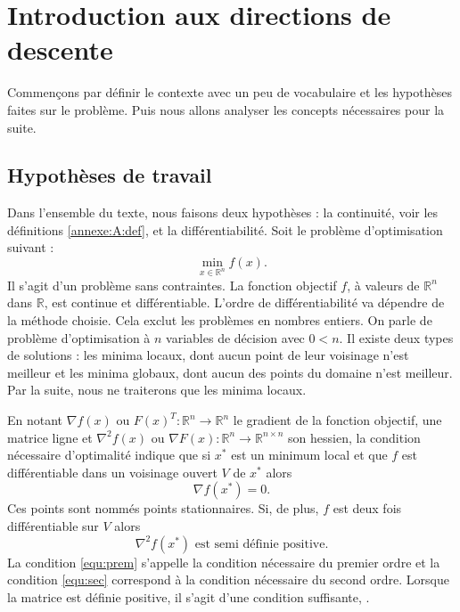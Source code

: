 







\section{Introduction aux directions de descente}
Commençons par d\'efinir le contexte avec un peu de vocabulaire et les hypoth\`eses faites sur le probl\`eme. Puis nous allons analyser
 les concepts n\'ecessaires pour la suite. 
\subsection{Hypoth\`eses de travail}
Dans l'ensemble du texte, nous faisons deux hypoth\`eses : la continuit\'e, voir les d\'efinitions \ref{annexe:A:def}, et la diff\'erentiabilit\'e.
Soit le probl\`eme d'optimisation suivant :
\begin{equation}
\min_{x\in \mathbb{R}^n} f(x).
\label{eq:princ}
\end{equation}
Il s'agit d'un probl\`eme sans contraintes. La fonction objectif $f$, \`a valeurs de
 $\mathbb{R}^n$ dans $\mathbb{R}$, est continue et diff\'erentiable. L'ordre de diff\'erentiabilit\'e va d\'ependre de la m\'ethode choisie. 
 Cela exclut les probl\`emes en nombres entiers. On parle de probl\`eme d'optimisation \`a $n$ variables de d\'ecision avec $0<n$. 
Il existe deux types de solutions : les minima locaux, dont aucun point de leur voisinage n'est meilleur et les minima globaux, dont aucun des points
du domaine n'est meilleur. Par la suite, nous ne traiterons que les minima locaux. 

En notant $\nabla f(x) $ ou $F(x)^T:\mathbb{R}^n\rightarrow \mathbb{R}^n$ le gradient de la fonction objectif, une matrice ligne et 
$ \nabla^2f(x)$ ou $\nabla F(x): \mathbb{R}^n\rightarrow \mathbb{R}^{n\times n} $ son hessien, la condition n\'ecessaire d'optimalit\'e 
indique que si $x^*$ est un minimum local et que $f$ est diff\'erentiable dans un voisinage ouvert $V$ de $x^*$ alors 
\begin{equation}
\label{equ:prem}
\nabla f(x^*)=0.
\end{equation}
Ces points sont nomm\'es points stationnaires.
Si, de plus, $f$ est deux fois diff\'erentiable sur $V$ alors 
\begin{equation}
\label{equ:sec}
\nabla^2 f(x^*) \text{ est semi d\'efinie positive.}
\end{equation}
La condition \eqref{equ:prem} s'appelle la condition n\'ecessaire du premier ordre et la condition \eqref{equ:sec} correspond \`a la condition n\'ecessaire du second ordre.
Lorsque la matrice est d\'efinie positive, il s'agit d'une condition suffisante, \cite{opt}.


